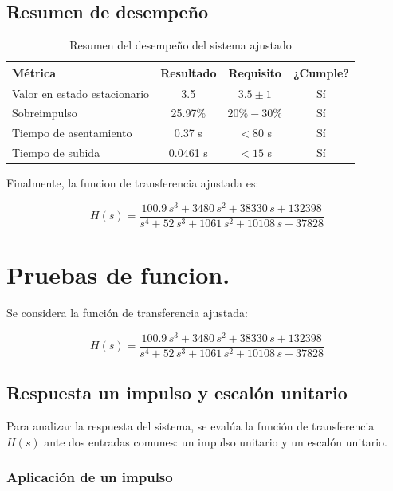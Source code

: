 \documentclass[11pt,letterpaper]{article}
\begin{document}
\subsection*{Resumen de desempeño}

\begin{table}[h]
\centering
\begin{tabular}{|l|c|c|c|}
\hline
\textbf{Métrica} & \textbf{Resultado} & \textbf{Requisito} & \textbf{¿Cumple?} \\
\hline
Valor en estado estacionario & 3.5       & $3.5 \pm 1$      & Sí \\
Sobreimpulso                 & 25.97\%   & $20\% - 30\%$    & Sí \\
Tiempo de asentamiento       & 0.37 s    & $< 80$ s         & Sí \\
Tiempo de subida             & 0.0461 s  & $< 15$ s         & Sí \\
\hline
\end{tabular}
\caption{Resumen del desempeño del sistema ajustado}
\end{table}

\newpage

Finalmente, la funcion de transferencia ajustada es:

\begin{equation}
  H(s) = \frac{100.9\,s^3 + 3480\,s^2 + 38330\,s + 132398}{s^4 + 52\,s^3 + 1061\,s^2 + 10108\,s + 37828}
\end{equation}

\section{Pruebas de funcion.}
Se considera la función de transferencia ajustada:

\begin{equation}
H(s) = \frac{100.9\,s^3 + 3480\,s^2 + 38330\,s + 132398}{s^4 + 52\,s^3 + 1061\,s^2 + 10108\,s + 37828}
\end{equation}

\subsection{Respuesta un impulso y escalón unitario}

Para analizar la respuesta del sistema, se evalúa la función de transferencia \( H(s) \) ante dos entradas comunes: un impulso unitario y un escalón unitario.

\subsubsection{Aplicación de un impulso}
\end{document}
